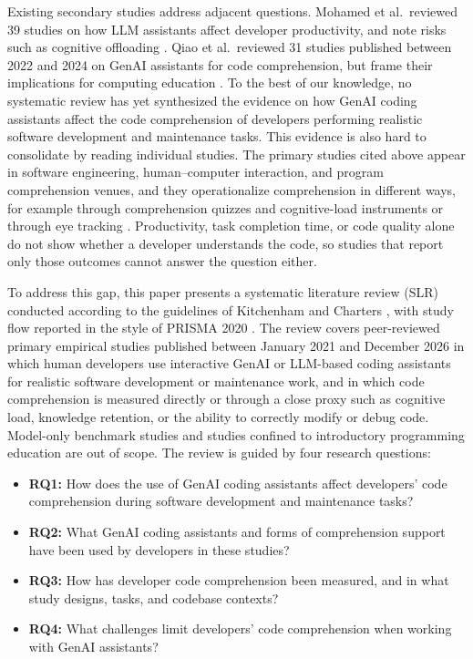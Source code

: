 \documentclass[conference]{IEEEtran}
\begin{document}
Existing secondary studies address adjacent questions. Mohamed et al.\ reviewed 39 studies on how LLM assistants affect developer productivity, and note risks such as cognitive offloading \cite{mohamed2026}. Qiao et al.\ reviewed 31 studies published between 2022 and 2024 on GenAI assistants for code comprehension, but frame their implications for computing education \cite{qiao2026}. To the best of our knowledge, no systematic review has yet synthesized the evidence on how GenAI coding assistants affect the code comprehension of developers performing realistic software development and maintenance tasks. This evidence is also hard to consolidate by reading individual studies. The primary studies cited above appear in software engineering, human--computer interaction, and program comprehension venues, and they operationalize comprehension in different ways, for example through comprehension quizzes and cognitive-load instruments \cite{kim2026} or through eye tracking \cite{tang2024}. Productivity, task completion time, or code quality alone do not show whether a developer understands the code, so studies that report only those outcomes cannot answer the question either.

To address this gap, this paper presents a systematic literature review (SLR) conducted according to the guidelines of Kitchenham and Charters \cite{kitchenham2007}, with study flow reported in the style of PRISMA 2020 \cite{page2021}. The review covers peer-reviewed primary empirical studies published between January 2021 and December 2026 in which human developers use interactive GenAI or LLM-based coding assistants for realistic software development or maintenance work, and in which code comprehension is measured directly or through a close proxy such as cognitive load, knowledge retention, or the ability to correctly modify or debug code. Model-only benchmark studies and studies confined to introductory programming education are out of scope. The review is guided by four research questions:

\begin{itemize}
\item \textbf{RQ1:} How does the use of GenAI coding assistants affect developers' code comprehension during software development and maintenance tasks?
\item \textbf{RQ2:} What GenAI coding assistants and forms of comprehension support have been used by developers in these studies?
\item \textbf{RQ3:} How has developer code comprehension been measured, and in what study designs, tasks, and codebase contexts?
\item \textbf{RQ4:} What challenges limit developers' code comprehension when working with GenAI assistants?
\end{itemize}
\end{document}
